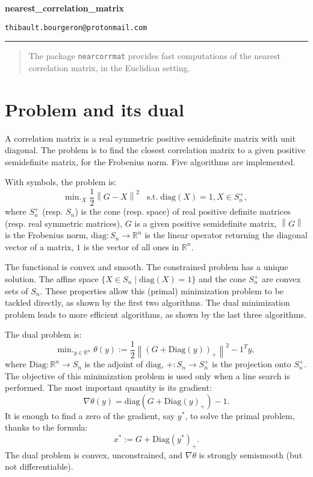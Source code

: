 \documentclass{article}
\newcommand{\norm}[1]{\left\lVert#1\right\rVert}
\newcommand{\R}{\mathbb{R}}
\begin{document}
\begin{center}
{\LARGE \textbf{nearest\_correlation\_matrix}}
\end{center}

\setlength\parindent{0pt}

\begin{center}
\texttt{thibault.bourgeron@protonmail.com}
\end{center}

\noindent\rule{\textwidth}{0.1pt}


\begin{abstract}
The package \texttt{nearcorrmat} provides fast computations of the nearest correlation matrix, in the Euclidian setting.
\end{abstract}

\section{Problem and its dual}

A correlation matrix is a real symmetric positive semidefinite matrix with unit diagonal.
The problem is to find the closest correlation matrix to a given positive semidefinite matrix, for the Frobenius norm. Five algorithms are implemented.

\medskip

With symbols, the problem is:
\[ \textrm{min.}_X \; \frac12 \norm{G - X}^2 \;\;\; \text{s.t.} \; \mathrm{diag}(X) = 1, X \in S_n^+, \]
where $S_n^+$ (resp. $S_n$) is the cone (resp. space) of real positive definite matrices (resp. real symmetric matrices), $G$ is a given positive semidefinite matrix, $\norm{G}$ is the Frobenius norm, $\mathrm{diag}: S_n \to \R^n$ is the linear operator returning the diagonal vector of a matrix, $1$ is the vector of all ones in $\R^n$.

\medskip

The functional is convex and smooth. The constrained problem has a unique solution. The affine space $\{X\in S_n \mid \mathrm{diag}(X) = 1\}$ and the cone $S_n^+$ are convex sets of $S_n$. These properties allow this (primal) minimization problem to be tackled directly, as shown by the first two algorithms. The dual minimization problem leads to more efficient algorithms, as shown by the last three algorithms.

\bigskip

The dual problem is:
\[\textrm{min.}_{y\in\R^n} \; \theta(y) := \frac12 \norm{(G + \mathrm{Diag}(y))_+}^2 - 1^T y, \]
where $\mathrm{Diag}: \R^n \to S_n$ is the adjoint of $\mathrm{diag}$, $+: S_n \to S_n^+$ is the projection onto $S_n^+$.
The objective of this minimization problem is used only when a line search is performed.
The most important quantity is its gradient:
\[
\nabla \theta(y) = \mathrm{diag}(G + \mathrm{Diag}(y)_+) - 1.
\]
It is enough to find a zero of the gradient, say $y^*$, to solve the primal problem, thanks to the formula:
\[ x^* := G + \mathrm{Diag}(y^*)_+. \]
The dual problem is convex, unconstrained, and $\nabla \theta$ is strongly semismooth (but not differentiable).
\end{document}
